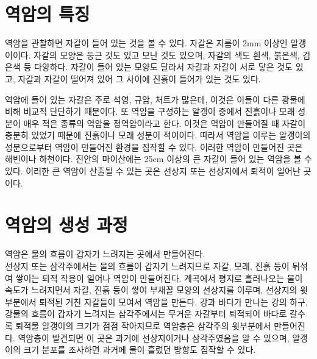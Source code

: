 \documentclass[12pt, a4paper, twoside]{book}
\begin{document}
	\clearpage
	\section{역암의 특징}


				역암을 관찰하면 자갈이 들어 있는 것을 볼 수 있다. 
				자갈은 지름이 2mm 이상인 알갱이이다. 
				자갈의 모양은 둥근 것도 있고 모난 것도 있으며, 자갈의 색도 흰색, 붉은색, 검은색 등 다양하다. 
				자갈이 들어 있는 모양도 달라서 자갈과 자갈이 서로 닿은 것도 있고, 자갈과 자갈이 떨어져 있어 그 사이에 진흙이 들어가 있는 것도 있다. 

				역암에 들어 있는 자갈은 주로 석영, 규암, 처트가 많은데, 이것은 이들이 다른 광물에 비해 비교적 단단하기 때문이다. 
				또 역암을 구성하는 알갱이 중에서 진흙이나 모래 성분이 매우 적은 종류의 역암을 정역암이라고 한다. 
				이것은 역암이 만들어질 때 자갈이 충분히 있었기 때문에 진흙이나 모래 성분이 적이이다. 
				따라서 역암을 이루는 알갱이의 성분으로부터 역암이 만들어진 환경을 짐작할 수 있다. 
				이러한 역암이 만들어진 곳은 해빈이나 하천이다. 
				진안의 마이산에는 25cm 이상의 큰 자갈이 들어 있는 역암을 볼 수 있다. 
				이러한 큰 역암이 산출될 수 있는 곳은 선상지 또는 선상지에서 퇴적이 일어난 곳이다.
				
				
				



	\clearpage
	\section{역암의 생성 과정}
		
				역암은 물의 흐름이 갑자기 느려지는 곳에서 만들어진다. \\
				
				선상지 또는 삼각주에서는 물의 흐름이 갑자기 느려지므로 자갈, 모래, 진흙 등이 뒤섞여 쌓이는 퇴적 작용이 일어나 역암이 만들어진다. 
				계곡에서 평지로 흘러나오는 물이 속도가 느려지면서 자갈, 진흙 등이 쌓여 부채꼴 모양의 선상지를 이루며, 선상지의 윗부분에서 퇴적된 거친 자갈들이 모여서 역암을 만든다. 
				강과 바다가 만나는 강의 하구, 강물의 흐름이 갑자기 느려지는 삼각주에서는 무거운 자갈부터 퇴적되어 바다로 갈수록 퇴적물 알갱이의 크기가 점점 작아지므로 역암층은 삼각주의 윗부분에서 만들어진다. 
				역암층이 발견되면 이 곳은 과거에 선상지이거나 삼각주였음을 알 수 있으며, 알갱이의 크기 분포를 조사하면 과거에 물이 흘렀던 방향도 짐작할 수 있다. 
\end{document}

